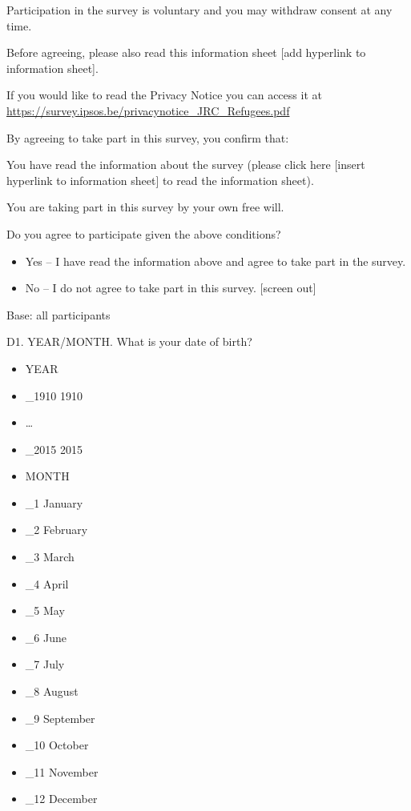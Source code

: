\documentclass[
  12pt,
  a4paper,
]{article}
\providecommand{\tightlist}{%
  \setlength{\itemsep}{0pt}\setlength{\parskip}{0pt}}
\begin{document}
Participation in the survey is voluntary and you may withdraw consent at any time.

Before agreeing, please also read this information sheet {[}add hyperlink to information sheet{]}.

If you would like to read the Privacy Notice you can access it at \url{https://survey.ipsos.be/privacynotice_JRC_Refugees.pdf}

By agreeing to take part in this survey, you confirm that:

You have read the information about the survey (please click here {[}insert hyperlink to information sheet{]} to read the information sheet).

You are taking part in this survey by your own free will.

Do you agree to participate given the above conditions?

\begin{itemize}
\tightlist
\item
  Yes -- I have read the information above and agree to take part in the survey.
\item
  No -- I do not agree to take part in this survey. {[}screen out{]}
\end{itemize}

Base: all participants

D1. YEAR/MONTH. What is your date of birth?

\begin{itemize}
\tightlist
\item
  YEAR
\item
  \_1910 1910
\item
  \ldots{}
\item
  \_2015 2015
\item
  MONTH
\item
  \_1 January
\item
  \_2 February
\item
  \_3 March
\item
  \_4 April
\item
  \_5 May
\item
  \_6 June
\item
  \_7 July
\item
  \_8 August
\item
  \_9 September
\item
  \_10 October
\item
  \_11 November
\item
  \_12 December
\end{itemize}
\end{document}
